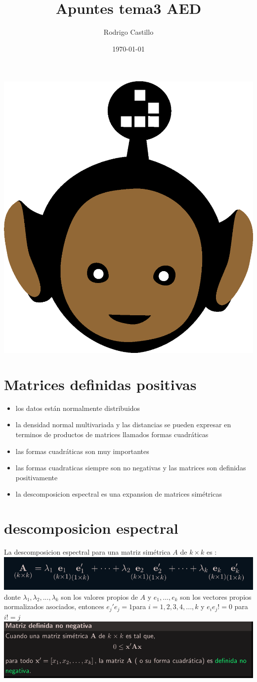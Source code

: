 \documentclass[10pt,a4paper]{article} %
\begin{document}
    \title{{  Apuntes tema3 AED  }}
    \author{{Rodrigo Castillo}}
    \date{\today}

    \maketitle


    \includegraphics[width=0.1\linewidth]{negro_cara.png}
    \section{Matrices definidas positivas}
    \begin{itemize}
        \item {los datos están normalmente distribuidos}
        \item {la densidad normal multivariada y las distancias se
            pueden expresar en terminos de productos de matrices
        llamados formas cuadráticas}
        \item {las formas cuadráticas son muy importantes}
        \item {las formas cuadraticas siempre son no negativas y las
            matrices son definidas positivamente}
        \item {la descomposicion espectral es una expansion de matrices
            simétricas}
    \end{itemize}

    \section{descomposicion espectral}
        La descomposicion espectral para una matriz simétrica $ A  $ de $ k \times  k  $ es :
        \\
        \includegraphics[width=0.5\linewidth]{desc.png}
        donte $ \lambda_1 , \lambda_2 , ... , \lambda_k  $ son los
        valores propios de $ A  $  y $ e_1 , ... , e_k   $ son los
        vectores propios normalizados asociados, entonces $ e_j'e_j = 1
        $para $ i = 1,2,3,4,...,k  $ y $ e_i e_j != 0   $ para $ i != j
        $
        \\
        \includegraphics[width=0.5\linewidth]{pos.png}
        \\
\end{document}
